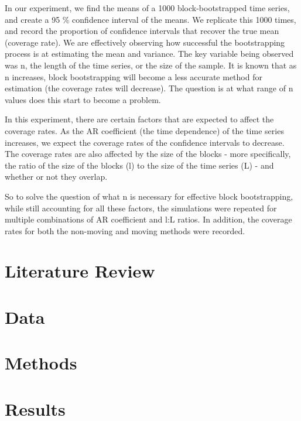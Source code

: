 \documentclass[10pt]{article}
\begin{document}
In our experiment, we find the means of a 1000 block-bootstrapped time series, 
and create a 95 \% confidence interval of the means. We replicate this 1000 times, 
and record the proportion of confidence intervals that recover the true mean 
(coverage rate). We are effectively observing how successful the bootstrapping process
is at estimating the mean and variance. The key variable being observed was n, 
the length of the time series, or the size of the sample. It is known that as n
increases, block bootstrapping will become a less accurate method for estimation
(the coverage rates will decrease). The question is at what range of n values does this
start to become a problem. 

In this experiment, there are certain factors that are expected to affect the coverage
rates. As the AR coefficient (the time dependence) of the time series increases,
we expect the coverage rates of the confidence intervals to decrease.
The coverage rates are also affected by the size of the blocks - more specifically,
the ratio of the size of the blocks (l) to the size of the time series (L) - 
and whether or not they overlap.

So to solve the question of what n is necessary for effective block bootstrapping,
while still accounting for all these factors, the simulations were repeated for
multiple combinations of AR coefficient and l:L ratios. In addition, the coverage rates
for both the non-moving and moving methods were recorded.

\section{Literature Review}





\section{Data}





\section{Methods}



\section{Results}
\end{document}
